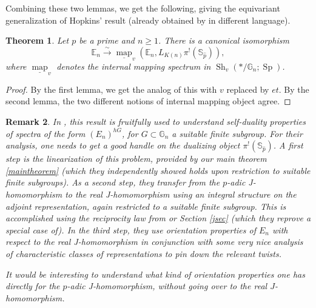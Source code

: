 \documentclass[12pt]{article}
\newtheorem{theorem}{Theorem}[section]
\newtheorem{remark}[theorem]{Remark}
\newcommand{\on}{\operatorname}
\newcommand{\mbb}{\mathbb}
\newcommand{\wh}{\widehat}
\begin{document}
Combining these two lemmas, we get the following, giving the equivariant generalization of Hopkins' result (already obtained by \cite{BeaudryLinearization} in different language).

\begin{theorem}
Let $p$ be a prime and $n\geq 1$.  There is a canonical isomorphism
$$\mathbb{E}_n\overset{\sim}{\rightarrow}\underline{\on{map}}_v(\mbb{E}_n,L_{K(n)}\pi^!(\mbb{S}_{\wh{p}})),$$
where $\underline{\on{map}}_v$ denotes the internal mapping spectrum in $\on{Sh}_v(\ast/\mathbb{G}_n;\on{Sp})$.
\end{theorem}
\begin{proof}
By the first lemma, we get the analog of this with $v$ replaced by $et$.  By the second lemma, the two different notions of internal mapping object agree.
\end{proof}

\begin{remark}
In \cite{BeaudryLinearization}, this result is fruitfully used to understand self-duality properties of spectra of the form $(E_n)^{hG}$, for $G\subset \mbb{G}_n$ a suitable finite subgroup.  For their analysis, one needs to get a good handle on the dualizing object $\pi^!(\mbb{S}_{\wh{p}})$.  A first step is the \emph{linearization} of this problem, provided by our main theorem \ref{maintheorem} (which they independently showed holds upon restriction to suitable finite subgroups).   As a second step, they transfer from the $p$-adic J-homomorphism to the real J-homomorphism using an integral structure on the adjoint representation, again restricted to a suitable finite subgroup.  This is accomplished using the reciprocity law from \cite{ClausenJ} or Section \ref{jsec} (which they reprove a special case of).  In the third step, they use  \emph{orientation} properties of $E_n$ with respect to the real J-homomorphism in conjunction with some very nice analysis of characteristic classes of representations to pin down the relevant twists.

It would be interesting to understand what kind of orientation properties one has directly for the $p$-adic J-homomorphism, without going over to the real $J$-homomorphism.
\end{remark}


\printbibliography
\end{document}
